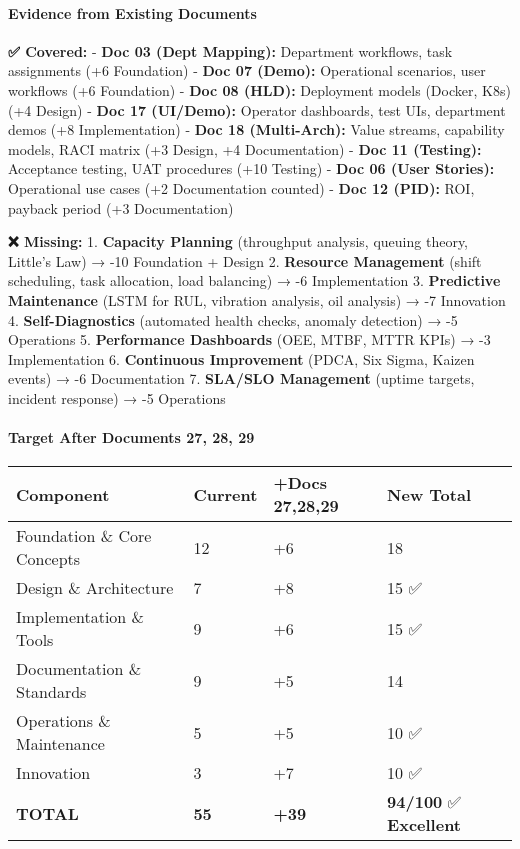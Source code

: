 \documentclass[
]{article}
\begin{document}
\hypertarget{evidence-from-existing-documents-5}{%
\paragraph{Evidence from Existing
Documents}\label{evidence-from-existing-documents-5}}

\textbf{✅ Covered:} - \textbf{Doc 03 (Dept Mapping):} Department
workflows, task assignments (+6 Foundation) - \textbf{Doc 07 (Demo):}
Operational scenarios, user workflows (+6 Foundation) - \textbf{Doc 08
(HLD):} Deployment models (Docker, K8s) (+4 Design) - \textbf{Doc 17
(UI/Demo):} Operator dashboards, test UIs, department demos (+8
Implementation) - \textbf{Doc 18 (Multi-Arch):} Value streams,
capability models, RACI matrix (+3 Design, +4 Documentation) -
\textbf{Doc 11 (Testing):} Acceptance testing, UAT procedures (+10
Testing) - \textbf{Doc 06 (User Stories):} Operational use cases (+2
Documentation counted) - \textbf{Doc 12 (PID):} ROI, payback period (+3
Documentation)

\textbf{❌ Missing:} 1. \textbf{Capacity Planning} (throughput analysis,
queuing theory, Little's Law) → -10 Foundation + Design 2.
\textbf{Resource Management} (shift scheduling, task allocation, load
balancing) → -6 Implementation 3. \textbf{Predictive Maintenance} (LSTM
for RUL, vibration analysis, oil analysis) → -7 Innovation 4.
\textbf{Self-Diagnostics} (automated health checks, anomaly detection) →
-5 Operations 5. \textbf{Performance Dashboards} (OEE, MTBF, MTTR KPIs)
→ -3 Implementation 6. \textbf{Continuous Improvement} (PDCA, Six Sigma,
Kaizen events) → -6 Documentation 7. \textbf{SLA/SLO Management} (uptime
targets, incident response) → -5 Operations

\hypertarget{target-after-documents-27-28-29}{%
\paragraph{Target After Documents 27, 28,
29}\label{target-after-documents-27-28-29}}

\begin{longtable}[]{@{}llll@{}}
\toprule\noalign{}
Component & Current & +Docs 27,28,29 & New Total \\
\midrule\noalign{}
\endhead
\bottomrule\noalign{}
\endlastfoot
Foundation \& Core Concepts & 12 & +6 & 18 \\
Design \& Architecture & 7 & +8 & 15 ✅ \\
Implementation \& Tools & 9 & +6 & 15 ✅ \\
Documentation \& Standards & 9 & +5 & 14 \\
Operations \& Maintenance & 5 & +5 & 10 ✅ \\
Innovation & 3 & +7 & 10 ✅ \\
\textbf{TOTAL} & \textbf{55} & \textbf{+39} & \textbf{94/100} ✅
\textbf{Excellent} \\
\end{longtable}
\end{document}
